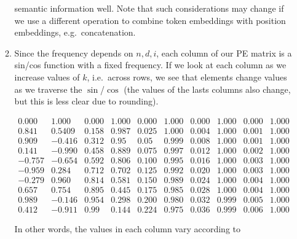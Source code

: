 \documentclass[11pt,a4paper]{article}
\begin{document}
\begin{enumerate}[label=(\alph*)]
\begin{enumerate}[label=(\roman*)]
                    semantic information well.
                    Note that such considerations may change if we use a
                    different operation to combine token embeddings with
                    position embeddings, e.g.\ concatenation.
              \item Since the frequency depends on $n,d,i$, each column of our PE
                    matrix is a sin/cos function with a fixed frequency.
                    If we look at each column as we increase values of $k$,
                    i.e.\ across rows, we see that elements change values as
                    we traverse the $\sin$/$\cos$ (the values of the lasts
                    columns also change, but this is less clear due to
                    rounding).
                    \begin{center}
                        $\begin{matrix}
                                0.000  & 1.000  & 0.000 & 1.000 & 0.000 & 1.000 & 0.000 & 1.000 & 0.000 & 1.000 \\
                                0.841  & 0.5409 & 0.158 & 0.987 & 0.025 & 1.000 & 0.004 & 1.000 & 0.001 & 1.000 \\
                                0.909  & -0.416 & 0.312 & 0.95  & 0.05  & 0.999 & 0.008 & 1.000 & 0.001 & 1.000 \\
                                0.141  & -0.990 & 0.458 & 0.889 & 0.075 & 0.997 & 0.012 & 1.000 & 0.002 & 1.000 \\
                                -0.757 & -0.654 & 0.592 & 0.806 & 0.100 & 0.995 & 0.016 & 1.000 & 0.003 & 1.000 \\
                                -0.959 & 0.284  & 0.712 & 0.702 & 0.125 & 0.992 & 0.020 & 1.000 & 0.003 & 1.000 \\
                                -0.279 & 0.960  & 0.814 & 0.581 & 0.150 & 0.989 & 0.024 & 1.000 & 0.004 & 1.000 \\
                                0.657  & 0.754  & 0.895 & 0.445 & 0.175 & 0.985 & 0.028 & 1.000 & 0.004 & 1.000 \\
                                0.989  & -0.146 & 0.954 & 0.298 & 0.200 & 0.980 & 0.032 & 0.999 & 0.005 & 1.000 \\
                                0.412  & -0.911 & 0.99  & 0.144 & 0.224 & 0.975 & 0.036 & 0.999 & 0.006 & 1.000
                            \end{matrix}$
                    \end{center}
                    In other words, the values in each column vary according to

\end{enumerate}
\end{enumerate}
\end{document}
